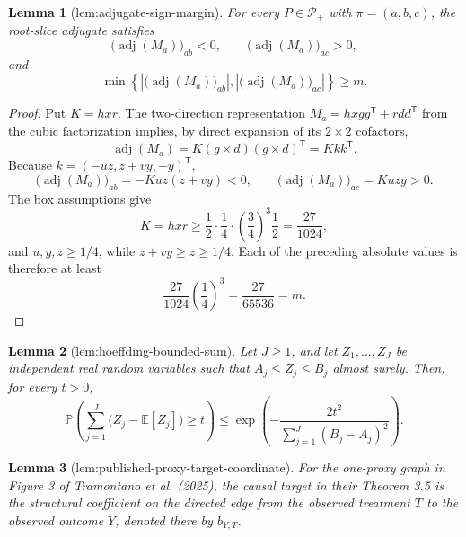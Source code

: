 \documentclass{article}
\newtheorem{lemma}{Lemma}
\begin{document}
\begin{lemma}[lem:adjugate-sign-margin]\label{lem:adjugate-sign-margin}
For every \(P\in\mathcal P_+\) with \(\pi=(a,b,c)\), the root-slice adjugate satisfies
\[
\bigl(\operatorname{adj}(M_a)\bigr)_{ab}<0,
\qquad
\bigl(\operatorname{adj}(M_a)\bigr)_{ac}>0,
\]
and
\[
\min\!\left\{\left|\bigl(\operatorname{adj}(M_a)\bigr)_{ab}\right|,
\left|\bigl(\operatorname{adj}(M_a)\bigr)_{ac}\right|\right\}\ge m.
\]
\end{lemma}
\begin{proof}
Put \(K=hxr\).  The two-direction representation
\(M_a=hxgg^{\mathsf T}+rdd^{\mathsf T}\) from the cubic factorization implies, by direct expansion of its \(2\times2\) cofactors,
\[
\operatorname{adj}(M_a)=K(g\times d)(g\times d)^{\mathsf T}=Kkk^{\mathsf T}.
\]
Because \(k=(-uz,z+vy,-y)^{\mathsf T}\),
\[
\bigl(\operatorname{adj}(M_a)\bigr)_{ab}
=-Kuz(z+vy)<0,
\qquad
\bigl(\operatorname{adj}(M_a)\bigr)_{ac}
=Kuzy>0.
\]
The box assumptions give
\[
K=hxr\ge \frac12\cdot\frac14\cdot
\left(\frac34\right)^3\frac12
=\frac{27}{1024},
\]
and \(u,y,z\ge1/4\), while \(z+vy\ge z\ge1/4\).  Each of the preceding absolute values is therefore at least
\[
\frac{27}{1024}\left(\frac14\right)^3
=\frac{27}{65536}=m.
\]
\end{proof}

\begin{lemma}[lem:hoeffding-bounded-sum]\label{lem:hoeffding-bounded-sum}
Let \(J\ge1\), and let \(Z_1,\ldots,Z_J\) be independent real random variables such that \(A_j\le Z_j\le B_j\) almost surely.  Then, for every \(t>0\),
\[
\mathbb P\!\left(\sum_{j=1}^J\bigl(Z_j-\mathbb E[Z_j]\bigr)\ge t\right)
\le
\exp\!\left(-\frac{2t^2}{\sum_{j=1}^J(B_j-A_j)^2}\right).
\]
\end{lemma}

\begin{lemma}[lem:published-proxy-target-coordinate]\label{lem:published-proxy-target-coordinate}
For the one-proxy graph in Figure 3 of Tramontano et al. (2025), the causal target in their Theorem 3.5 is the structural coefficient on the directed edge from the observed treatment \(T\) to the observed outcome \(Y\), denoted there by \(b_{Y,T}\).
\end{lemma}
\end{document}
